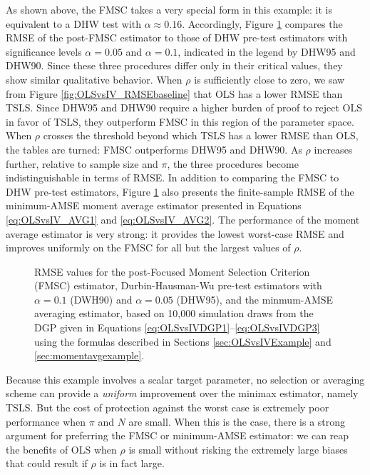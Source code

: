 As shown above, the FMSC takes a very special form in this example: it is equivalent to a DHW test with $\alpha \approx 0.16$.
Accordingly, Figure \ref{fig:OLSvsIV_AVG} compares the RMSE of the post-FMSC estimator to those of DHW pre-test estimators with significance levels $\alpha = 0.05$ and $\alpha = 0.1$, indicated in the legend by DHW95 and DHW90.
Since these three procedures differ only in their critical values, they show similar qualitative behavior.
When $\rho$ is sufficiently close to zero, we saw from Figure \ref{fig:OLSvsIV_RMSEbaseline} that OLS has a lower RMSE than TSLS.
Since DHW95 and DHW90 require a higher burden of proof to reject OLS in favor of TSLS, they outperform FMSC in this region of the parameter space.
When $\rho$ crosses the threshold beyond which TSLS has a lower RMSE than OLS, the tables are turned: FMSC outperforms DHW95 and DHW90.
As $\rho$ increases further, relative to sample size and $\pi$, the three procedures become indistinguishable in terms of RMSE.
In addition to comparing the FMSC to DHW pre-test estimators, Figure \ref{fig:OLSvsIV_AVG} also presents the finite-sample RMSE of the minimum-AMSE moment average estimator presented in Equations \ref{eq:OLSvsIV_AVG1} and \ref{eq:OLSvsIV_AVG2}.
The performance of the moment average estimator is very strong: it provides the lowest worst-case RMSE and improves uniformly on the FMSC for all but the largest values of $\rho$.


\begin{figure}
\centering
	
	\caption{RMSE values for the post-Focused Moment Selection Criterion (FMSC) estimator, Durbin-Hausman-Wu pre-test estimators with $\alpha = 0.1$ (DWH90) and $\alpha = 0.05$ (DHW95), and the minmum-AMSE averaging estimator, based on 10,000 simulation draws from the DGP given in Equations \ref{eq:OLSvsIVDGP1}--\ref{eq:OLSvsIVDGP3} using the formulas described in Sections \ref{sec:OLSvsIVExample} and \ref{sec:momentavgexample}.}
	\label{fig:OLSvsIV_AVG}
\end{figure}

Because this example involves a scalar target parameter, no selection or averaging scheme can provide a \emph{uniform} improvement over the minimax estimator, namely TSLS. 
But the cost of protection against the worst case is extremely poor performance when $\pi$ and $N$ are small.
When this is the case, there is a strong argument for preferring the FMSC or minimum-AMSE estimator: we can reap the benefits of OLS when $\rho$ is small without risking the extremely large biases that could result if $\rho$ is in fact large.
